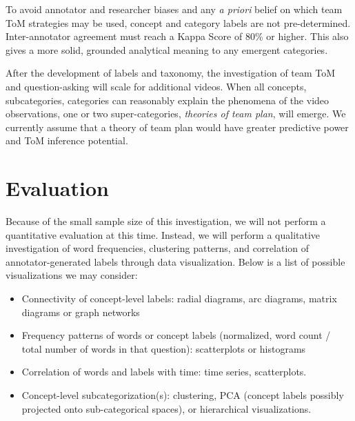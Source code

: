 To avoid annotator and researcher biases and any \emph{a priori} belief on
which team ToM strategies may be used, concept and category labels are not
pre-determined. Inter-annotator agreement must reach a Kappa Score of 80\% or
higher. This also gives a more solid, grounded analytical meaning to any
emergent categories. 

After the development of labels and taxonomy, the investigation of team ToM and
question-asking will scale for additional videos. When all concepts,
subcategories, categories can reasonably explain the phenomena of the video
observations, one or two super-categories, \emph{theories of team plan}, will
emerge. We currently assume that a theory of team plan would have greater
predictive power and ToM inference potential. 


\section{Evaluation}

Because of the small sample size of this investigation, we will not perform a
quantitative evaluation at this time. Instead, we will perform a qualitative
investigation of word frequencies, clustering patterns, and correlation of
annotator-generated labels through data visualization. Below is a list of
possible visualizations we may consider:

\begin{itemize}

    \item Connectivity of concept-level labels: radial diagrams, arc diagrams,
        matrix diagrams or graph networks

    \item Frequency patterns of words or concept labels (normalized, word count
        / total number of words in that question): scatterplots or histograms

    \item Correlation of words and labels with time: time series, scatterplots. 

    \item Concept-level subcategorization(s): clustering, PCA (concept labels
        possibly projected onto sub-categorical spaces), or hierarchical
        visualizations.

\end{itemize}


